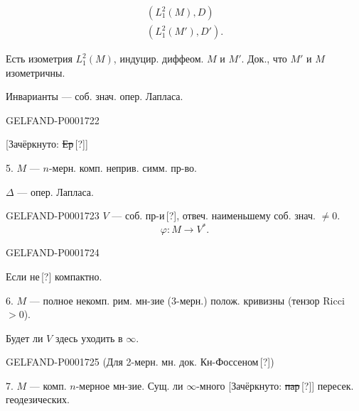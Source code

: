 \begin{gather*}
(L_1^2(M),D)\\
(L_1^2(M'),D').
\end{gather*}


Есть изометрия $L_1^2(M)$, индуцир. диффеом. $M$ и $M'$.
Док., что $M'$ и $M$ изометричны.

Инварианты — соб. знач. опер. Лапласа.

\begin{GelfandAdjacentEvidence}{GELFAND-P000172}{2}

[Зачёркнуто: \sout{Ер}\,[?]]
\end{GelfandAdjacentEvidence}

5. $M$ — $n$-мерн. комп. неприв. симм. пр-во.

$\Delta$ — опер. Лапласа.

\begin{GelfandAdjacentEvidence}{GELFAND-P000172}{3}
$V$ — соб. пр-и\,[?], отвеч. наименьшему соб. знач. $\ne0$.
\begin{equation*}\varphi:M\longrightarrow V^*.\end{equation*}
\end{GelfandAdjacentEvidence}
\begin{GelfandAdjacentEvidence}{GELFAND-P000172}{4}

Если не\,[?] компактно.
\end{GelfandAdjacentEvidence}


6. $M$ — полное некомп. рим. мн-зие (3-мерн.) полож. кривизны
(тензор Ricci $>0$).

Будет ли $V$ здесь уходить в $\infty$.

\begin{GelfandAdjacentEvidence}{GELFAND-P000172}{5}
(Для 2-мерн. мн. док. Кн-Фоссеном\,[?])
\end{GelfandAdjacentEvidence}


7. $M$ — комп. $n$-мерное мн-зие.
Сущ. ли $\infty$-много
[Зачёркнуто: \sout{пар}\,[?]] пересек. геодезических.

